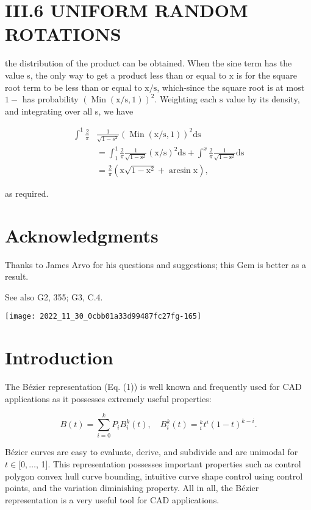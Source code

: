 \section{III.6 UNIFORM RANDOM ROTATIONS}
the distribution of the product can be obtained. When the sine term has the value s, the only way to get a product less than or equal to $\mathrm{x}$ is for the square root term to be less than or equal to $\mathrm{x} / \mathrm{s}$, which-since the square root is at most $1-$ has probability $(\operatorname{Min}(\mathrm{x} / \mathrm{s}, 1))^{2}$. Weighting each $\mathrm{s}$ value by its density, and integrating over all s, we have

$$
\begin{aligned}
\int^{1} \frac{2}{\pi} & \frac{1}{\sqrt{1-s^{2}}}(\operatorname{Min}(\mathrm{x} / \mathrm{s}, 1))^{2} \mathrm{ds} \\
&=\int_{1}^{1} \frac{2}{\pi} \frac{1}{\sqrt{1-\mathrm{s}^{2}}}(\mathrm{x} / \mathrm{s})^{2} \mathrm{ds}+\int^{x} \frac{2}{\pi} \frac{1}{\sqrt{1-\mathrm{s}^{2}}} \mathrm{ds} \\
&=\frac{2}{\pi}\left(\mathrm{x} \sqrt{1-\mathrm{x}^{2}}+\arcsin \mathrm{x}\right),
\end{aligned}
$$

as required.

\section{Acknowledgments}
Thanks to James Arvo for his questions and suggestions; this Gem is better as a result.

See also G2, 355; G3, C.4.

\begin{center}
\texttt{[image: 2022\_11\_30\_0cbb01a33d99487fc27fg-165]}
\end{center}

\section{Introduction}
The Bézier representation (Eq. (1)) is well known and frequently used for CAD applications as it possesses extremely useful properties:

$$
B(t)=\sum_{i=0}^{k} P_{i} B_{i}^{k}(t), \quad B_{i}^{k}(t)={ }_{i}^{k} t^{i}(1-t)^{k-i} .
$$

Bézier curves are easy to evaluate, derive, and subdivide and are unimodal for $t \in[0, \ldots$, 1]. This representation possesses important properties such as control polygon convex hull curve bounding, intuitive curve shape control using control points, and the variation diminishing property. All in all, the Bézier representation is a very useful tool for CAD applications.

